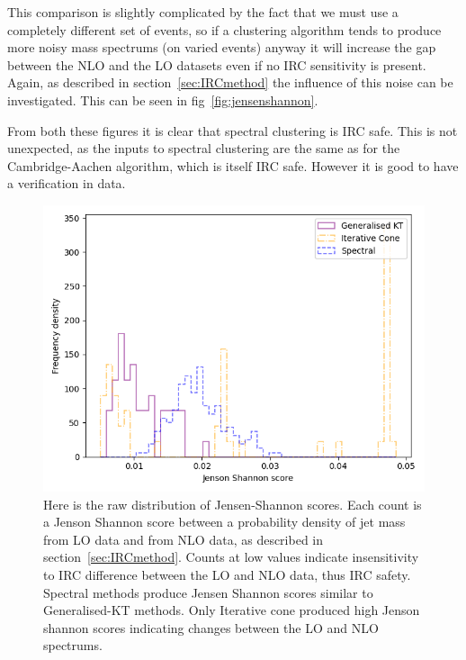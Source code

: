 This comparison is slightly complicated by the fact that we must use a completely different set of events,
so if a clustering algorithm tends to produce more noisy mass spectrums (on varied events)
anyway it will increase the gap between the NLO and the LO datasets even if no IRC sensitivity is present.
Again, as described in section~\ref{sec:IRCmethod} the influence of this noise can be investigated.
This can be seen in fig~\ref{fig:jensenshannon}.

From both these figures it is clear that spectral clustering is IRC safe.
This is not unexpected, as the inputs to spectral clustering
are the same as for the Cambridge-Aachen algorithm, 
which is itself IRC safe.
However it is good to have a verification in data.

\begin{figure}[htp]
    \begin{minipage}[c]{0.6\textwidth}
    \includegraphics[width=1.\textwidth]{graphics/JensenShannon_unnormed.png}
    \end{minipage}\hfill
    \begin{minipage}[c]{0.35\textwidth}
    \caption{Here is the raw distribution of Jensen-Shannon scores.
        Each count is a Jenson Shannon score between a probability density of jet mass from LO data and
        from NLO data, as described in section~\ref{sec:IRCmethod}.
        Counts at low values indicate insensitivity to IRC difference between the LO and NLO data,
        thus IRC safety.
        Spectral methods produce Jensen Shannon scores similar to Generalised-KT
        methods. Only Iterative cone produced high Jenson shannon scores indicating changes
        between the LO and NLO spectrums.
     }\label{fig:unnormedJS}
    \end{minipage}
\end{figure}    
